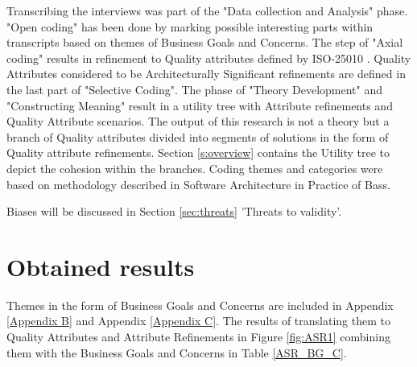 Transcribing the interviews was part of the "Data collection and Analysis" phase. "Open coding" has been done by marking possible interesting parts within transcripts based on themes of Business Goals and Concerns. The step of "Axial coding" results in refinement to Quality attributes defined by ISO-25010 \cite{ISO:25010:2011}. Quality Attributes considered to be Architecturally Significant refinements are defined in the last part of "Selective Coding". The phase of "Theory Development" and "Constructing Meaning" result in a utility tree with Attribute refinements and Quality Attribute scenarios. The output of this research is not a theory but a branch of Quality attributes divided into segments of solutions in the form of Quality attribute refinements. Section \ref{s:overview} contains the Utility tree to depict the cohesion within the branches. Coding themes and categories were based on methodology described in Software Architecture in Practice of Bass\etal \cite{Bass2015SoftwareAI}.

Biases will be discussed in Section \ref{sec:threats} 'Threats to validity'.

\section{Obtained results}
Themes in the form of Business Goals and Concerns are included in Appendix \ref{Appendix B} and Appendix \ref{Appendix C}. The results of translating them to Quality Attributes and Attribute Refinements in Figure \ref{fig:ASR1} combining them with the Business Goals and Concerns in Table \ref{ASR_BG_C}.




